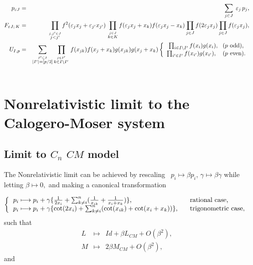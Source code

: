 \documentclass[a4paper,12pt]{article}
\newcommand{\sect}[1]{\setcounter{equation}{0}\section{#1}}
\begin{document}
\begin{eqnarray}
p_{\varepsilon J} &=&\sum_{j\in J}\;\varepsilon _{j}\,p_{j},  \nonumber \\
F_{\varepsilon J;\,K} &=&\,\prod_{\stackrel{j,j^{\prime }\in J}{j<j^{\prime }%
}}f^{2}(\varepsilon _{j}x_{j}+\varepsilon _{j^{\prime }}x_{j^{\prime
}})\,\prod_{\stackrel{j\in J}{k\in K}}f(\varepsilon
_{j}x_{j}+x_{k})f(\varepsilon _{j}x_{j}-x_{k})\prod_{j\in J}f(2\varepsilon
_{j}x_{j})\prod_{j\in J}f(\varepsilon _{j}x_{j}),  \nonumber \\
U_{I,p} &=&\sum_{\stackrel{I^{\prime }\subset I}{|I^{\prime }|=\lbrack p/2\rbrack }}\prod_{%
\stackrel{j\in I^{\prime }}{k\in I\backslash I^{\prime }}%
\,}f(x_{jk})f(x_{j}+x_{k})g(x_{jk})g(x_{j}+x_{k})\left\{
\begin{array}{c}
\prod_{i\in I\backslash I^{\prime }}f(x_{i})g(x_{i}),\mbox{ \ ($p$ odd),} \\
\prod_{i^{\prime }\in I^{\prime }}f(x_{i^{\prime }})g(x_{i^{\prime }}),%
\mbox{
\ \ ($p$ even).}
\end{array}
\right.	 \nonumber \\
&&
\end{eqnarray}

\sect{Nonrelativistic limit to the Calogero-Moser system}
\label{non}

\subsection{\protect\vspace{1pt}Limit to $C_{n}$ $CM$ model}

The Nonrelativistic limit can be achieved by rescaling \ $p_{i}\longmapsto
\beta p_{i}$, $\gamma \longmapsto \beta \gamma $ while letting $\beta
\longmapsto 0,$ and making a canonical transformation

\begin{eqnarray}
\left\{
\begin{tabular}{ll}
$p_{i}\longmapsto p_{i}+\gamma \{\frac{1}{2x_{i}}+\sum_{k\neq i}^{n}(\frac{1%
}{x_{ik}}+\frac{1}{x_{i}+x_{k}})\},\ $ & rational case, \\
$p_{i}\longmapsto p_{i}+\gamma \{\cot (2x_{i})+\sum_{k\neq i}^{n}(\cot
(x_{ik})+\cot (x_{i}+x_{k}))\},\ \ $ & trigonometric case,
\end{tabular}
\right.
\end{eqnarray}
\noindent such that
\begin{eqnarray}
L &\longmapsto &Id+\beta L_{CM}+O(\beta ^{2}), \\
M &\longmapsto &2\beta M_{CM}+O(\beta ^{2}),
\end{eqnarray}
and
\end{document}
